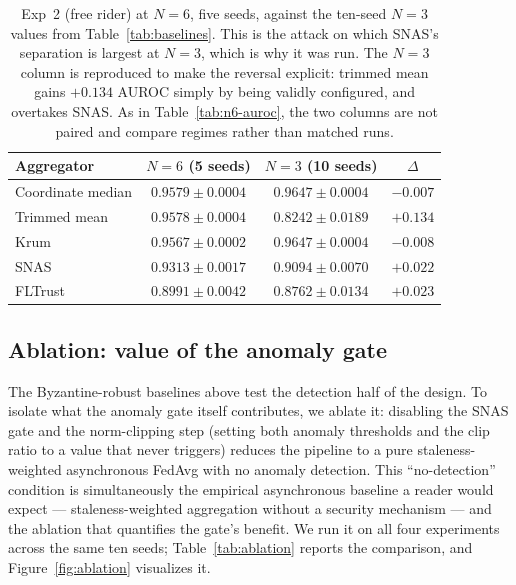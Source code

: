 \documentclass[pdflatex,sn-mathphys-num]{sn-jnl}
\begin{document}
\begin{table}[htbp]
\caption{Exp~2 (free rider) at $N=6$, five seeds, against the ten-seed $N=3$ values from Table~\ref{tab:baselines}. This is the attack on which SNAS's separation is largest at $N=3$, which is why it was run. The $N=3$ column is reproduced to make the reversal explicit: trimmed mean gains $+0.134$ AUROC simply by being validly configured, and overtakes SNAS. As in Table~\ref{tab:n6-auroc}, the two columns are not paired and compare regimes rather than matched runs.}
\label{tab:n6-e2}
\centering
\begin{tabular}{lccc}
\toprule
Aggregator & $N=6$ (5 seeds) & $N=3$ (10 seeds) & $\Delta$ \\
\midrule
Coordinate median & $\mathbf{0.9579} \pm 0.0004$ & $0.9647 \pm 0.0004$ & $-0.007$ \\
Trimmed mean      & $0.9578 \pm 0.0004$ & $0.8242 \pm 0.0189$ & $\mathbf{+0.134}$ \\
Krum              & $0.9567 \pm 0.0002$ & $0.9647 \pm 0.0004$ & $-0.008$ \\
SNAS              & $0.9313 \pm 0.0017$ & $0.9094 \pm 0.0070$ & $+0.022$ \\
FLTrust           & $0.8991 \pm 0.0042$ & $0.8762 \pm 0.0134$ & $+0.023$ \\
\bottomrule
\end{tabular}
\end{table}

\subsection{Ablation: value of the anomaly gate}

The Byzantine-robust baselines above test the detection half of the design. To isolate what the anomaly gate itself contributes, we ablate it: disabling the SNAS gate and the norm-clipping step (setting both anomaly thresholds and the clip ratio to a value that never triggers) reduces the pipeline to a pure staleness-weighted asynchronous FedAvg with no anomaly detection. This ``no-detection'' condition is simultaneously the empirical asynchronous baseline a reader would expect --- staleness-weighted aggregation without a security mechanism --- and the ablation that quantifies the gate's benefit. We run it on all four experiments across the same ten seeds; Table~\ref{tab:ablation} reports the comparison, and Figure~\ref{fig:ablation} visualizes it.
\end{document}
